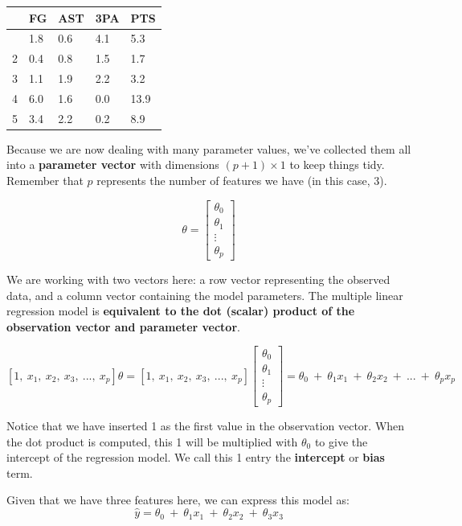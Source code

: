 \documentclass[
  letterpaper,
  DIV=11,
  numbers=noendperiod]{scrreprt}
\begin{document}
\begin{longtable}[]{@{}lllll@{}}
\toprule\noalign{}
& FG & AST & 3PA & PTS \\
\midrule\noalign{}
\endhead
\bottomrule\noalign{}
\endlastfoot
1 & 1.8 & 0.6 & 4.1 & 5.3 \\
2 & 0.4 & 0.8 & 1.5 & 1.7 \\
3 & 1.1 & 1.9 & 2.2 & 3.2 \\
4 & 6.0 & 1.6 & 0.0 & 13.9 \\
5 & 3.4 & 2.2 & 0.2 & 8.9 \\
\end{longtable}

Because we are now dealing with many parameter values, we've collected
them all into a \textbf{parameter vector} with dimensions
\((p+1) \times 1\) to keep things tidy. Remember that \(p\) represents
the number of features we have (in this case, 3).

\[\theta = \begin{bmatrix}
           \theta_{0} \\
           \theta_{1} \\
           \vdots \\
           \theta_{p}
         \end{bmatrix}\]

We are working with two vectors here: a row vector representing the
observed data, and a column vector containing the model parameters. The
multiple linear regression model is \textbf{equivalent to the dot
(scalar) product of the observation vector and parameter vector}.

\[[1,\:x_{1},\:x_{2},\:x_{3},\:...,\:x_{p}] \theta = [1,\:x_{1},\:x_{2},\:x_{3},\:...,\:x_{p}] \begin{bmatrix}
           \theta_{0} \\
           \theta_{1} \\
           \vdots \\
           \theta_{p}
         \end{bmatrix} = \theta_0\:+\:\theta_1x_{1}\:+\:\theta_2 x_{2}\:+\:...\:+\:\theta_p x_{p}\]

Notice that we have inserted 1 as the first value in the observation
vector. When the dot product is computed, this 1 will be multiplied with
\(\theta_0\) to give the intercept of the regression model. We call this
1 entry the \textbf{intercept} or \textbf{bias} term.

Given that we have three features here, we can express this model as:
\[\hat{y} = \theta_0\:+\:\theta_1x_{1}\:+\:\theta_2 x_{2}\:+\:\theta_3 x_{3}\]
\end{document}
